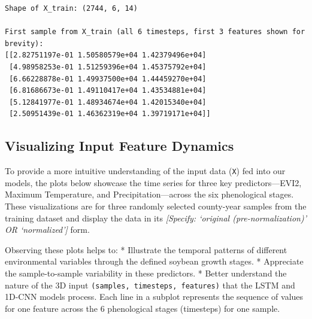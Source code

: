 \documentclass[
  letterpaper,
  DIV=11,
  numbers=noendperiod]{scrreprt}
\begin{document}
\begin{verbatim}
Shape of X_train: (2744, 6, 14)

First sample from X_train (all 6 timesteps, first 3 features shown for brevity):
[[2.82751197e-01 1.50580579e+04 1.42379496e+04]
 [4.98958253e-01 1.51259396e+04 1.45375792e+04]
 [6.66228878e-01 1.49937500e+04 1.44459270e+04]
 [6.81686673e-01 1.49110417e+04 1.43534881e+04]
 [5.12841977e-01 1.48934674e+04 1.42015340e+04]
 [2.50951439e-01 1.46362319e+04 1.39719171e+04]]
\end{verbatim}

\subsection{Visualizing Input Feature
Dynamics}\label{visualizing-input-feature-dynamics}

To provide a more intuitive understanding of the input data (\texttt{X})
fed into our models, the plots below showcase the time series for three
key predictors---EVI2, Maximum Temperature, and Precipitation---across
the six phenological stages. These visualizations are for three randomly
selected county-year samples from the training dataset and display the
data in its \emph{{[}Specify: `original (pre-normalization)' OR
`normalized'{]}} form.

Observing these plots helps to: * Illustrate the temporal patterns of
different environmental variables through the defined soybean growth
stages. * Appreciate the sample-to-sample variability in these
predictors. * Better understand the nature of the 3D input
\texttt{(samples,\ timesteps,\ features)} that the LSTM and 1D-CNN
models process. Each line in a subplot represents the sequence of values
for one feature across the 6 phenological stages (timesteps) for one
sample.
\end{document}
